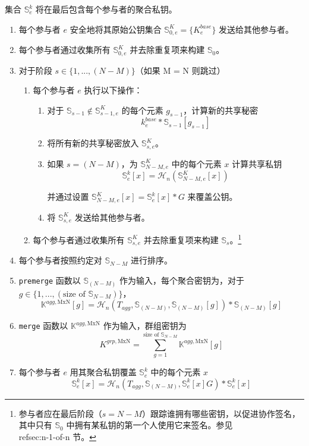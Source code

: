 集合 $\mathbb{S}^{k}_{e}$ 将在最后包含每个参与者的聚合私钥。
\begin{enumerate}
    \item 每个参与者 $e$ 安全地将其原始公钥集合 $\mathbb{S}^K_{0,e} = \{K^{base}_e\}$ 发送给其他参与者。
    \item 每个参与者通过收集所有 $\mathbb{S}^K_{0,e}$ 并去除重复项来构建 $\mathbb{S}_{0}$。
    \item 对于阶段 $s \in \{1,...,(N-M)\}$（如果 M = N 则跳过）
    \begin{enumerate}
        \item 每个参与者 $e$ 执行以下操作：
        \begin{enumerate}
            \item 对于 $\mathbb{S}_{s-1} \notin \mathbb{S}^K_{s-1,e}$ 的每个元素 $g_{s-1}$，计算新的共享秘密 \[k^{base}_e*\mathbb{S}_{s-1}[g_{s-1}]\]
            \item 将所有新的共享秘密放入 $\mathbb{S}^K_{s,e}$。
            \item 如果 $s = (N-M)$，为 $\mathbb{S}^K_{N-M,e}$ 中的每个元素 $x$ 计算共享私钥
            \[\mathbb{S}^{k}_{e}[x] = \mathcal{H}_n(\mathbb{S}^K_{N-M,e}[x])\]

            并通过设置 $\mathbb{S}^K_{N-M,e}[x] = \mathbb{S}^{k}_{e}[x]*G$ 来覆盖公钥。
            \item 将 $\mathbb{S}^K_{s,e}$ 发送给其他参与者。
        \end{enumerate}
        \item 每个参与者通过收集所有 $\mathbb{S}^K_{s,e}$ 并去除重复项来构建 $\mathbb{S}_{s}$。\footnote{参与者应在最后阶段（$s = N-M$）跟踪谁拥有哪些密钥，以促进协作签名，其中只有 $\mathbb{S}_0$ 中拥有某私钥的第一个人使用它来签名。参见 \\ref{sec:n-1-of-n} 节。}
    \end{enumerate}
    \item 每个参与者按照约定对 $\mathbb{S}_{N-M}$ 进行排序。
    \item {\tt premerge} 函数以 $\mathbb{S}_{(N-M)}$ 作为输入，每个聚合密钥为，对于 \(g \in \{1,...,(\textrm{size of }\mathbb{S}_{N-M})\}\)，\vspace{.175cm}
    \[\mathbb{K}^{agg,\textrm{MxN}}[g] = \mathcal{H}_n(T_{agg},\mathbb{S}_{(N-M)},\mathbb{S}_{(N-M)}[g])*\mathbb{S}_{(N-M)}[g]\]
    \item {\tt merge} 函数以 $\mathbb{K}^{agg,\textrm{MxN}}$ 作为输入，群组密钥为\vspace{.175cm}
    \[K^{grp,\textrm{MxN}} = \sum^{\textrm{size of }\mathbb{S}_{N-M}}_{g = 1} \mathbb{K}^{agg,\textrm{MxN}}[g]\]
    \item 每个参与者 $e$ 用其聚合私钥覆盖 $\mathbb{S}^k_{e}$ 中的每个元素 $x$\vspace{.175cm}
    \[ \mathbb{S}^k_{e}[x] = \mathcal{H}_n(T_{agg},\mathbb{S}_{(N-M)},\mathbb{S}^k_{e}[x] G)*\mathbb{S}^k_{e}[x] \]
\end{enumerate}

